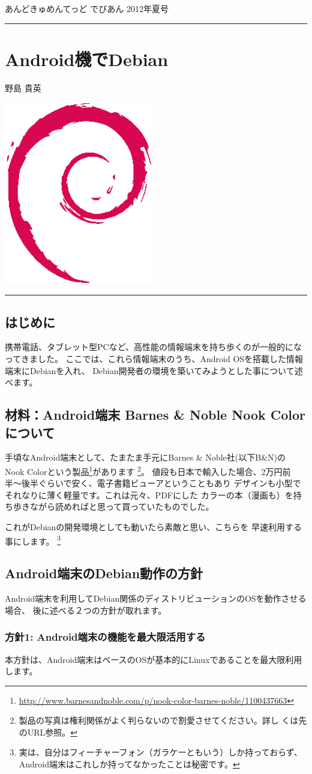 \documentclass[mingoth,a4paper]{jsarticle}
\renewcommand{\dancersection}[2]{%
\newpage
あんどきゅめんてっど でびあん 2012年夏号
%
\vspace{0.1mm}\\
{\color{dancerdarkblue}\rule{\hsize}{2mm}}

%
%
\begin{minipage}[t]{0.6\hsize}
\color{dancerdarkblue}
\vspace{1cm}
\section{#1}
\hfill{}#2\\
\end{minipage}
\begin{minipage}[t]{0.4\hsize}
\vspace{-2cm}
\hfill{}\includegraphics[height=8cm]{image200502/openlogo-nd.eps}\\
\vspace{-5cm}
\end{minipage}
%
{\color{dancerlightblue}\rule{0.66\hsize}{2mm}}
%
\vspace{2cm}
}
\begin{document}
\clearpage

\dancersection{Android機でDebian}{野島 貴英}
\label{sec:android-debian}

\subsection{はじめに}
携帯電話、タブレット型PCなど、高性能の情報端末を持ち歩くのが一般的になってきました。
ここでは、これら情報端末のうち、Android OSを搭載した情報端末にDebianを入れ、
Debian開発者の環境を築いてみようとした事について述べます。

\subsection{材料：Android端末 Barnes \& Noble Nook Colorについて}

手頃なAndroid端末として、たまたま手元にBarnes \& Noble社(以下B\&N)の
Nook Colorという製品\footnote{\url{http://www.barnesandnoble.com/p/nook-color-barnes-noble/1100437663}}があります
\footnote{製品の写真は権利関係がよく判らないので割愛させてください。詳し
くは先のURL参照。}。
値段も日本で輸入した場合、2万円前半〜後半ぐらいで安く、電子書籍ビューアということもあり
デザインも小型でそれなりに薄く軽量です。これは元々、PDFにした
カラーの本（漫画も）を持ち歩きながら読めればと思って買っていたものでした。

これがDebianの開発環境としても動いたら素敵と思い、こちらを
早速利用する事にします。
\footnote{実は、自分はフィーチャーフォン（ガラケーともいう）しか持っておらず、Android端末はこれしか持ってなかったことは秘密です。}

\subsection{Android端末のDebian動作の方針}

Android端末を利用してDebian関係のディストリビューションのOSを動作させる場合、
後に述べる２つの方針が取れます。

\subsubsection{方針1: Android端末の機能を最大限活用する}

本方針は、Android端末はベースのOSが基本的にLinuxであることを最大限利用します。
\end{document}
